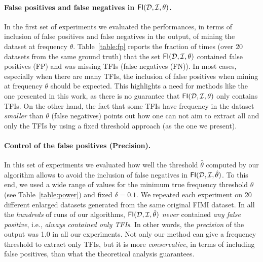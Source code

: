 \paragraph*{False positives and false negatives in
$\mathsf{FI}({\cal D},{\cal I},\theta)$.}
In the first set of experiments we evaluated the performances, in terms of
inclusion of false positives and false negatives in the output, of mining the
dataset at frequency $\theta$. Table~\ref{table:fp} reports  
the fraction of times (over 20 datasets from the same
ground truth) that the set $\mathsf{FI}({\cal D},{\cal I},\theta)$ contained false positives
(FP) and was missing TFIs (false negatives (FN)). In most cases, especially when there are
many TFIs, the inclusion of false positives when mining at frequency $\theta$
should be expected. This highlights a need for methods like the one presented in
this work, as there is no guarantee that $\mathsf{FI}({\cal D},{\cal I},\theta)$
only contains TFIs. On the other hand,
the fact that some TFIs have frequency in the dataset \emph{smaller} than
$\theta$ (false negatives) points out how one can not aim to extract all and
only the TFIs by using a fixed threshold approach (as the one we present).

\paragraph*{Control of the false positives (Precision).}\label{sec:fwer}
In this set of experiments we evaluated how well the threshold $\hat\theta$
computed by our algorithm allows to avoid the inclusion of false negatives in
$\mathsf{FI}({\cal D},{\cal I},\hat\theta)$. %
To this end, we used a wide range of values for the minimum true frequency
threshold $\theta$ (see Table~\ref{table:power}) and fixed $\delta=0.1$. We
repeated each experiment on 20 different enlarged datasets generated from the
same original FIMI dataset. %
In all the \emph{hundreds} of runs of our algorithms, %
$\mathsf{FI}({\cal D},{\cal I},\hat\theta)$ \emph{never} contained \emph{any false
positive}, i.e., \emph{always contained only TFIs}. In other words, the
\emph{precision} of the output was 1.0 in all our experiments. Not %
only our
method can give a frequency threshold to extract only TFIs, but %
it is more
\emph{conservative}, in terms of including false positives, than what the
theoretical analysis guarantees. %

